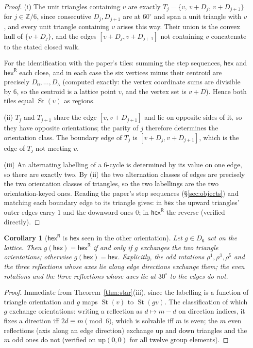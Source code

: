 \documentclass[11pt]{article}
\newtheorem{corollary}[theorem]{Corollary}
\theoremstyle{definition}
\newcommand{\hex}{\mathsf{hex}}
\newcommand{\hexR}{\mathsf{hex}^{\mathsf{R}}}
\newcommand{\Star}{\operatorname{St}}
\begin{document}
\begin{proof}
(i) The unit triangles containing $v$ are exactly
$T_j=\{v,\,v+D_j,\,v+D_{j+1}\}$ for $j\in\mathbb{Z}/6$, since consecutive
$D_j,D_{j+1}$ are at $60^\circ$ and span a unit triangle with $v$, and every
unit triangle containing $v$ arises this way. Their union is the convex hull of
$\{v+D_j\}$, and the edges $[v+D_j,v+D_{j+1}]$ not containing $v$ concatenate to
the stated closed walk.

For the identification with the paper's tiles: summing the step sequences,
$\hex$ and $\hexR$ each close, and in each case the six vertices minus their
centroid are precisely $D_0,\dots,D_5$ (computed exactly: the vertex coordinate
sums are divisible by $6$, so the centroid is a lattice point $v$, and the
vertex set is $v+D$). Hence both tiles equal $\Star(v)$ as regions.

(ii) $T_j$ and $T_{j+1}$ share the edge $[v,v+D_{j+1}]$ and lie on opposite
sides of it, so they have opposite orientations; the parity of $j$ therefore
determines the orientation class. The boundary edge of $T_j$ is
$[v+D_j,v+D_{j+1}]$, which is the edge of $T_j$ not meeting $v$.

(iii) An alternating labelling of a $6$-cycle is determined by its value on one
edge, so there are exactly two. By (ii) the two alternation classes of edges are
precisely the two orientation classes of triangles, so the two labellings are
the two orientation-keyed ones. Reading the paper's step sequences
(\S\ref{sec:objects}) and matching each boundary edge to its triangle gives: in
$\hex$ the upward triangles' outer edges carry $1$ and the downward ones $0$;
in $\hexR$ the reverse (verified directly).
\end{proof}

\begin{corollary}[$\hexR$ is $\hex$ seen in the other orientation]\label{cor:dual}
Let $g\in D_6$ act on the lattice. Then $g(\hex)=\hexR$ if and only if $g$
exchanges the two triangle orientations; otherwise $g(\hex)=\hex$. Explicitly,
the odd rotations $\rho^{1},\rho^{3},\rho^{5}$ and the three reflections whose
axes lie \emph{along} edge directions exchange them; the even rotations and the
three reflections whose axes lie at $30^\circ$ to the edges do not.
\end{corollary}

\begin{proof}
Immediate from Theorem~\ref{thm:star}(iii), since the labelling is a function of
triangle orientation and $g$ maps $\Star(v)$ to $\Star(g v)$. The classification
of which $g$ exchange orientations: writing a reflection as $d\mapsto m-d$ on
direction indices, it fixes a direction iff $2d\equiv m \pmod 6$, which is
solvable iff $m$ is even; the $m$ even reflections (axis along an edge
direction) exchange up and down triangles and the $m$ odd ones do not
(verified on $\mathrm{up}(0,0)$ for all twelve group elements).
\end{proof}
\end{document}
